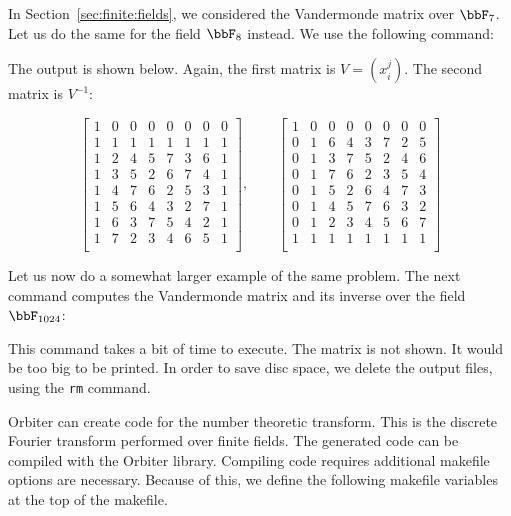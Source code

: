 In Section~\ref{sec:finite:fields}, we considered the Vandermonde matrix over $\bbF_7$. 
Let us do the same for the field $\bbF_8$ instead. We use the following command:
{\tt

}
The output is shown below. Again, the first matrix is $V = (x_{i}^j).$ The second matrix is $V^{-1}$:
\begin{mdframed}[style=MyFrame]
$$
\left[
\begin{array}{*{8}{c}}
1 & 0 & 0 & 0 & 0 & 0 & 0 & 0\\
1 & 1 & 1 & 1 & 1 & 1 & 1 & 1\\
1 & 2 & 4 & 5 & 7 & 3 & 6 & 1\\
1 & 3 & 5 & 2 & 6 & 7 & 4 & 1\\
1 & 4 & 7 & 6 & 2 & 5 & 3 & 1\\
1 & 5 & 6 & 4 & 3 & 2 & 7 & 1\\
1 & 6 & 3 & 7 & 5 & 4 & 2 & 1\\
1 & 7 & 2 & 3 & 4 & 6 & 5 & 1\\
\end{array}
\right]
, \qquad
\left[
\begin{array}{*{8}{c}}
1 & 0 & 0 & 0 & 0 & 0 & 0 & 0\\
0 & 1 & 6 & 4 & 3 & 7 & 2 & 5\\
0 & 1 & 3 & 7 & 5 & 2 & 4 & 6\\
0 & 1 & 7 & 6 & 2 & 3 & 5 & 4\\
0 & 1 & 5 & 2 & 6 & 4 & 7 & 3\\
0 & 1 & 4 & 5 & 7 & 6 & 3 & 2\\
0 & 1 & 2 & 3 & 4 & 5 & 6 & 7\\
1 & 1 & 1 & 1 & 1 & 1 & 1 & 1\\
\end{array}
\right]
$$
\end{mdframed}

\bigskip


Let us now do a somewhat larger example of the same problem. 
The next command computes the Vandermonde matrix and its inverse over the field 
$\bbF_{1024}$:
{\tt

}
This command takes a bit of time to execute. The matrix is not shown. It would be too big to be printed.
In order to save disc space, we delete the output files, using the \verb'rm' command.

\bigskip






Orbiter can create code for the number theoretic transform. 
This is the discrete Fourier transform performed over finite fields.
The generated code can be compiled with the Orbiter library. 
Compiling code requires additional makefile options are necessary. 
Because of this, we define the following makefile variables 
at the top of the makefile.
{\tt

}

